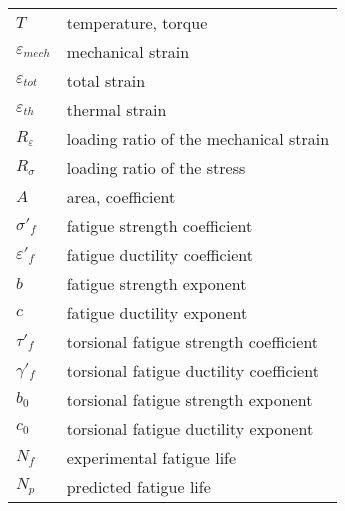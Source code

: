 \begin{table}[!hbp]
  \centering
    \begin{tabular}{p{4cm}p{9.5cm}}
    $T$ & temperature, torque \\
    $\varepsilon_{mech}$ & mechanical strain \\
    $\varepsilon_{tot}$ & total strain \\
    $\varepsilon_{th}$ & thermal strain \\
    $R_{\varepsilon}$ & loading ratio of the mechanical strain \\
    $R_{\sigma}$ & loading ratio of the stress \\
    $A$ & area, coefficient \\
    $\sigma'_f$ & fatigue strength coefficient \\
    $\varepsilon'_f$ & fatigue ductility coefficient \\
    $b$ & fatigue strength exponent \\
    $c$ & fatigue ductility exponent \\
    $\tau'_f$ & torsional fatigue strength coefficient \\
    $\gamma'_f$ & torsional fatigue ductility coefficient \\
    $b_0$ & torsional fatigue strength exponent \\
    $c_0$ & torsional fatigue ductility exponent \\
    $N_f$ & experimental fatigue life \\
    $N_p$ & predicted fatigue life \\
    \end{tabular}%
  \label{Tab:symbols2}%
\end{table}%



